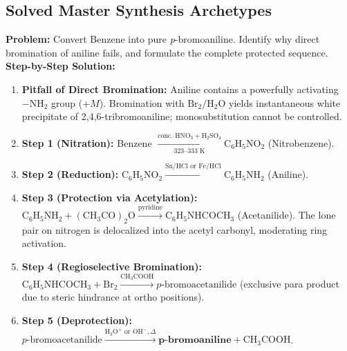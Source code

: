 \documentclass[10pt,a4paper]{article}
\begin{document}
\subsection{Solved Master Synthesis Archetypes}

\begin{usecasebox}
\textbf{Problem:} Convert Benzene into pure \textit{p}-bromoaniline. Identify why direct bromination of aniline fails, and formulate the complete protected sequence.
\textbf{Step-by-Step Solution:}
\begin{enumerate}[leftmargin=*]
  \item \textbf{Pitfall of Direct Bromination:} Aniline contains a powerfully activating $-\mathrm{NH_2}$ group ($+M$). Bromination with $\mathrm{Br_2 / H_2O}$ yields instantaneous white precipitate of 2,4,6-tribromoaniline; monosubstitution cannot be controlled.
  \item \textbf{Step 1 (Nitration):} Benzene $\xrightarrow[\text{323--333 K}]{\text{conc. } \mathrm{HNO_3} + \mathrm{H_2SO_4}} \mathrm{C_6H_5NO_2}$ (Nitrobenzene).
  \item \textbf{Step 2 (Reduction):} $\mathrm{C_6H_5NO_2} \xrightarrow{\mathrm{Sn / HCl \text{ or } Fe / HCl}} \mathrm{C_6H_5NH_2}$ (Aniline).
  \item \textbf{Step 3 (Protection via Acetylation):} $\mathrm{C_6H_5NH_2} + \mathrm{(CH_3CO)_2O} \xrightarrow{\text{pyridine}} \mathrm{C_6H_5NHCOCH_3}$ (Acetanilide). The lone pair on nitrogen is delocalized into the acetyl carbonyl, moderating ring activation.
  \item \textbf{Step 4 (Regioselective Bromination):} $\mathrm{C_6H_5NHCOCH_3} + \mathrm{Br_2} \xrightarrow{\mathrm{CH_3COOH}} p\text{-bromoacetanilide}$ (exclusive para product due to steric hindrance at ortho positions).
  \item \textbf{Step 5 (Deprotection):} $p\text{-bromoacetanilide} \xrightarrow{\mathrm{H_3O^+ \text{ or } OH^-}, \Delta} \mathbf{p\textbf{-bromoaniline}} + \mathrm{CH_3COOH}$.
\end{enumerate}
\end{usecasebox}
\end{document}
